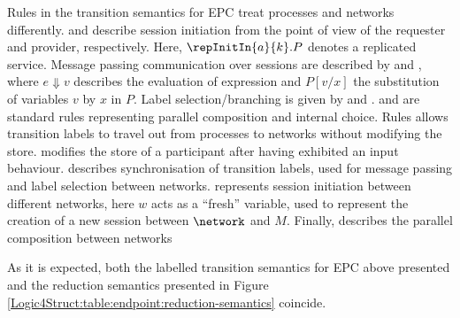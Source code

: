 Rules in the transition semantics for EPC treat processes and networks
differently.  and  describe 
session initiation from the point of view of the requester and
provider, respectively. Here, $\repInitIn{a}{k}.P$ denotes a
replicated service. Message passing communication over sessions are
described by and , where $e\Downarrow v$
describes the evaluation of expression and $P[v/x] $ the substitution
of variables $v$ by $x$ in $P$. Label
selection/branching is given by  and
.  and  are standard rules
representing parallel composition and internal choice. Rules
 allows transition labels to travel out from processes to
networks without modifying the store.  modifies the
store of a participant after having exhibited an input
behaviour.  describes synchronisation of transition labels,
used for message passing and label selection between
networks.  represents session initiation between different
networks, here $w$ acts as a ``fresh'' variable, used to represent
the creation of a new session between $\network$ and $M$. Finally,  
 describes the parallel composition between networks


As it is expected, both the  labelled transition semantics for EPC above presented
and the reduction semantics presented in
Figure \ref{Logic4Struct:table:endpoint:reduction-semantics} coincide.


